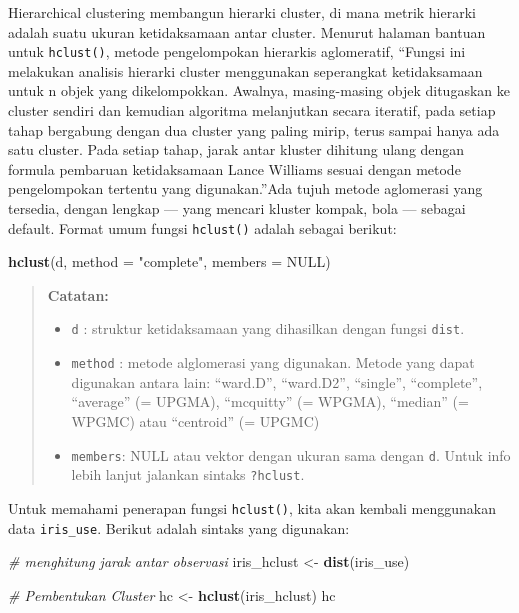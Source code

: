 \documentclass[]{book}
\newenvironment{Shaded}{\begin{snugshade}}{\end{snugshade}}
\newcommand{\CommentTok}[1]{\textcolor[rgb]{0.56,0.35,0.01}{\textit{#1}}}
\newcommand{\DataTypeTok}[1]{\textcolor[rgb]{0.13,0.29,0.53}{#1}}
\newcommand{\KeywordTok}[1]{\textcolor[rgb]{0.13,0.29,0.53}{\textbf{#1}}}
\newcommand{\NormalTok}[1]{#1}
\newcommand{\OtherTok}[1]{\textcolor[rgb]{0.56,0.35,0.01}{#1}}
\newcommand{\StringTok}[1]{\textcolor[rgb]{0.31,0.60,0.02}{#1}}
\providecommand{\tightlist}{%
  \setlength{\itemsep}{0pt}\setlength{\parskip}{0pt}}
\theoremstyle{definition}
\theoremstyle{definition}
\theoremstyle{definition}
\theoremstyle{remark}
\begin{document}
Hierarchical clustering membangun hierarki cluster, di mana metrik hierarki adalah suatu ukuran ketidaksamaan antar cluster. Menurut halaman bantuan untuk \texttt{hclust()}, metode pengelompokan hierarkis aglomeratif, ``Fungsi ini melakukan analisis hierarki cluster menggunakan seperangkat ketidaksamaan untuk n objek yang dikelompokkan. Awalnya, masing-masing objek ditugaskan ke cluster sendiri dan kemudian algoritma melanjutkan secara iteratif, pada setiap tahap bergabung dengan dua cluster yang paling mirip, terus sampai hanya ada satu cluster. Pada setiap tahap, jarak antar kluster dihitung ulang dengan formula pembaruan ketidaksamaan Lance Williams sesuai dengan metode pengelompokan tertentu yang digunakan.''Ada tujuh metode aglomerasi yang tersedia, dengan lengkap --- yang mencari kluster kompak, bola --- sebagai default. Format umum fungsi \texttt{hclust()} adalah sebagai berikut:

\begin{Shaded}
\begin{Highlighting}[]
\KeywordTok{hclust}\NormalTok{(d, }\DataTypeTok{method =} \StringTok{"complete"}\NormalTok{, }\DataTypeTok{members =} \OtherTok{NULL}\NormalTok{)}
\end{Highlighting}
\end{Shaded}

\begin{quote}
\textbf{Catatan:}

\begin{itemize}
\tightlist
\item
  \texttt{d} : struktur ketidaksamaan yang dihasilkan dengan fungsi \texttt{dist}.
\item
  \texttt{method} : metode alglomerasi yang digunakan. Metode yang dapat digunakan antara lain: ``ward.D'', ``ward.D2'', ``single'', ``complete'', ``average'' (= UPGMA), ``mcquitty'' (= WPGMA), ``median'' (= WPGMC) atau ``centroid'' (= UPGMC)
\item
  \texttt{members}: NULL atau vektor dengan ukuran sama dengan \texttt{d}. Untuk info lebih lanjut jalankan sintaks \texttt{?hclust}.
\end{itemize}
\end{quote}

Untuk memahami penerapan fungsi \texttt{hclust()}, kita akan kembali menggunakan data \texttt{iris\_use}. Berikut adalah sintaks yang digunakan:

\begin{Shaded}
\begin{Highlighting}[]
\CommentTok{# menghitung jarak antar observasi}
\NormalTok{iris_hclust <-}\StringTok{ }\KeywordTok{dist}\NormalTok{(iris_use)}

\CommentTok{# Pembentukan Cluster}
\NormalTok{hc <-}\StringTok{ }\KeywordTok{hclust}\NormalTok{(iris_hclust)}
\NormalTok{hc}
\end{Highlighting}
\end{Shaded}
\end{document}
